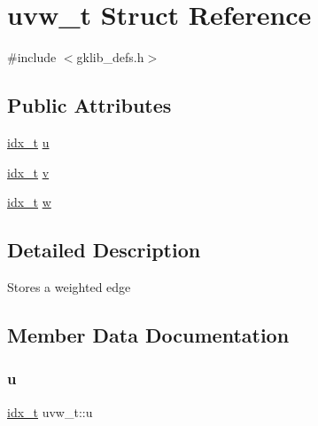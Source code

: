 \hypertarget{structuvw__t}{}\section{uvw\+\_\+t Struct Reference}
\label{structuvw__t}


{\ttfamily \#include $<$gklib\+\_\+defs.\+h$>$}

\subsection*{Public Attributes}
\begin{DoxyCompactItemize}
\item 
\hyperlink{3rd_party_2parmetis-4_80_83_2metis_2include_2metis_8h_aaa5262be3e700770163401acb0150f52}{idx\+\_\+t} \hyperlink{structuvw__t_a5acfd17a9a2237ffd08a084887fc2f49}{u}
\item 
\hyperlink{3rd_party_2parmetis-4_80_83_2metis_2include_2metis_8h_aaa5262be3e700770163401acb0150f52}{idx\+\_\+t} \hyperlink{structuvw__t_a9acbeec0726e1cf3842a174e44031bcc}{v}
\item 
\hyperlink{3rd_party_2parmetis-4_80_83_2metis_2include_2metis_8h_aaa5262be3e700770163401acb0150f52}{idx\+\_\+t} \hyperlink{structuvw__t_ad8b9f1185850e05876ee066a461c0d9d}{w}
\end{DoxyCompactItemize}


\subsection{Detailed Description}
Stores a weighted edge 

\subsection{Member Data Documentation}
\mbox{\label{structuvw__t_a5acfd17a9a2237ffd08a084887fc2f49}} 
\subsubsection{\texorpdfstring{u}{u}}
{\footnotesize\ttfamily \hyperlink{3rd_party_2parmetis-4_80_83_2metis_2include_2metis_8h_aaa5262be3e700770163401acb0150f52}{idx\+\_\+t} uvw\+\_\+t\+::u}

\mbox{\label{structuvw__t_a9acbeec0726e1cf3842a174e44031bcc}} 
